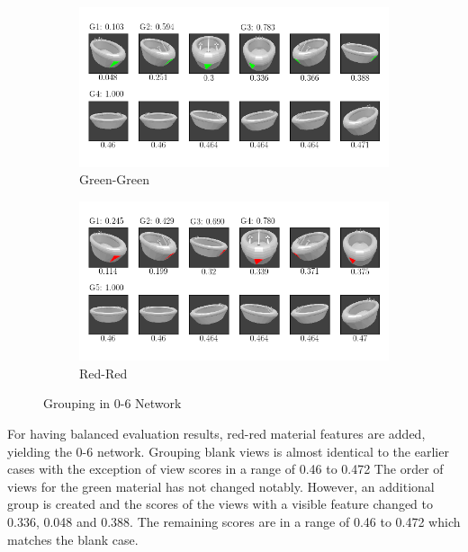\begin{figure}
	\centering
	\begin{subfigure}{\textwidth}
		\includegraphics[trim=10 20 10 20, clip]{images/mn-sl-0-6-20/bathtub_0107_4_grouping.png}
		\caption{Green-Green}
		\label{fig:grouping-0-6-green-green}
	\end{subfigure}
	\begin{subfigure}{\textwidth}
		\includegraphics[trim=10 20 10 20, clip]{images/mn-sl-0-6-20/bathtub_0107_5_grouping.png}
		\caption{Red-Red}
		\label{fig:grouping-0-6-red-red}
	\end{subfigure}
	\caption[Grouping in 0-6 Network]{Grouping in 0-6 Network}
	\label{fig:grouping-0-6}
\end{figure}
For having balanced evaluation results, red-red material features are added, yielding the 0-6 network.
Grouping blank views is almost identical to the earlier cases with the exception of view scores in a range of 0.46 to 0.472
The order of views for the green material has not changed notably.
However, an additional group is created and the scores of the views with a visible feature changed to 0.336, 0.048 and 0.388.
The remaining scores are in a range of 0.46 to 0.472 which matches the blank case.
